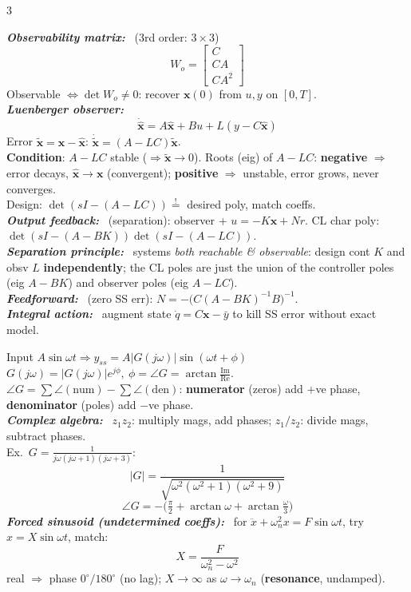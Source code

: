 \documentclass[9pt]{extarticle}
\newcommand{\sect}[1]{%
  \vspace{2pt}\par\noindent
  \colorbox{hdrbg}{\makebox[\dimexpr\linewidth-2\fboxsep][l]{%
    \textbf{\footnotesize\textcolor{hdr}{#1}}}}%
  \par\vspace{1.5pt}}
\newcommand{\sub}[1]{\textit{\textbf{#1:}}\ }
\begin{document}
\begin{multicols}{3}
\sect{11. Observability / Observers (Lec 8)}
\sub{Observability matrix} (3rd order: $3\times3$)
\[ W_o=\begin{bmatrix}C\\CA\\CA^2\end{bmatrix} \]
Observable $\Leftrightarrow \det W_o\neq0$: recover $\mathbf x(0)$ from $u,y$ on $[0,T]$.\\
\sub{Luenberger observer}
\[ \dot{\hat{\mathbf x}}=A\hat{\mathbf x}+Bu+L(y-C\hat{\mathbf x}) \]
Error $\tilde{\mathbf x}=\mathbf x-\hat{\mathbf x}$: $\dot{\tilde{\mathbf x}}=(A-LC)\tilde{\mathbf x}$.\\
\textbf{Condition}: $A-LC$ stable ($\Rightarrow\tilde{\mathbf x}\!\to\!0$). Roots (eig) of $A{-}LC$: \textbf{negative} $\Rightarrow$ error decays, $\hat{\mathbf x}\!\to\!\mathbf x$ (convergent); \textbf{positive} $\Rightarrow$ unstable, error grows, never converges.\\
Design: $\det(sI-(A-LC))\overset{!}{=}$ desired poly, match coeffs.\\
\sub{Output feedback} (separation): observer + $u=-K\hat{\mathbf x}+Nr$. CL char poly: $\det(sI{-}(A{-}BK))\det(sI{-}(A{-}LC))$.\\
\sub{Separation principle} systems \emph{both reachable \& observable}: design cont $K$ and obsv $L$ \textbf{independently}; the CL poles are just the union of the controller poles (eig $A{-}BK$) and observer poles (eig $A{-}LC$).\\
\sub{Feedforward} (zero SS err): $N=-\big(C(A-BK)^{-1}B\big)^{-1}$.\\
\sub{Integral action} augment state $\dot q=C\mathbf x-\bar y$ to kill SS error without exact model.

\sect{12. Frequency Response (Lec 9)}
Input $A\sin\omega t\Rightarrow y_{ss}=A|G(j\omega)|\sin(\omega t+\phi)$\\
$G(j\omega)=|G(j\omega)|e^{j\phi},\ \phi=\angle G=\arctan\tfrac{\mathrm{Im}}{\mathrm{Re}}$.\\
$\angle G=\sum\angle(\text{num})-\sum\angle(\text{den})$: \textbf{numerator} (zeros) add $+$ve phase, \textbf{denominator} (poles) add $-$ve phase.\\
\sub{Complex algebra} $z_1z_2$: multiply mags, add phases; $z_1/z_2$: divide mags, subtract phases.\\
Ex.\ $G=\frac{1}{j\omega(j\omega+1)(j\omega+3)}$:
\[ |G|=\frac{1}{\sqrt{\omega^2(\omega^2{+}1)(\omega^2{+}9)}} \]
\[ \angle G=-\big(\tfrac{\pi}{2}+\arctan\omega+\arctan\tfrac{\omega}{3}\big) \]
\sub{Forced sinusoid (undetermined coeffs)} for $\ddot x+\omega_n^2x=F\sin\omega t$, try $x{=}X\sin\omega t$, match:
\[ X=\frac{F}{\omega_n^2-\omega^2} \]
real $\Rightarrow$ phase $0^\circ/180^\circ$ (no lag); $X\!\to\!\infty$ as $\omega\!\to\!\omega_n$ (\textbf{resonance}, undamped).


\end{multicols}
\end{document}
